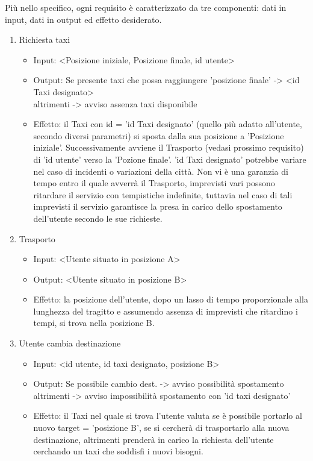 Più nello specifico, ogni requisito è caratterizzato da tre componenti: dati in input, dati in output ed effetto desiderato.

\begin{enumerate}
	\item Richiesta taxi
		\begin{itemize}
			\item Input:  <Posizione iniziale, Posizione finale, id utente>
			\item Output: Se presente taxi che possa raggiungere 'posizione finale' -> <id Taxi designato> \\
						  altrimenti -> avviso assenza taxi disponibile
			\item Effetto: il Taxi con id = 'id Taxi designato' (quello più adatto all'utente, secondo diversi parametri) si sposta dalla sua posizione a 'Posizione iniziale'. Successivamente avviene il Trasporto (vedasi prossimo requisito) di 'id utente' verso la 'Pozione finale'. 'id Taxi designato' potrebbe variare nel caso di incidenti o variazioni della città. Non vi è una garanzia di tempo entro il quale avverrà il Trasporto, imprevisti vari possono ritardare il servizio con tempistiche indefinite, tuttavia nel caso di tali imprevisti il servizio garantisce la presa in carico dello spostamento dell'utente secondo le sue richieste.
		\end{itemize}

	\item Trasporto
		\begin{itemize}
			\item Input:  <Utente situato in posizione A>
			\item Output: <Utente situato in posizione B>
			\item Effetto: la posizione dell'utente, dopo un lasso di tempo proporzionale alla lunghezza del tragitto e assumendo assenza di imprevisti che ritardino i tempi, si trova nella posizione B.
		\end{itemize}

	\item Utente cambia destinazione
		\begin{itemize}
			\item Input: <id utente, id taxi designato, posizione B>
			\item Output: Se possibile cambio dest. -> avviso possibilità spostamento \\
						  altrimenti -> avviso impossibilità spostamento con 'id taxi designato'
			\item Effetto: il Taxi nel quale si trova l'utente valuta se è possibile portarlo al nuovo target = 'posizione B', se si cercherà di trasportarlo alla nuova destinazione, altrimenti prenderà in carico la richiesta dell'utente cerchando un taxi che soddisfi i nuovi bisogni.
		\end{itemize}
	

\end{enumerate}
